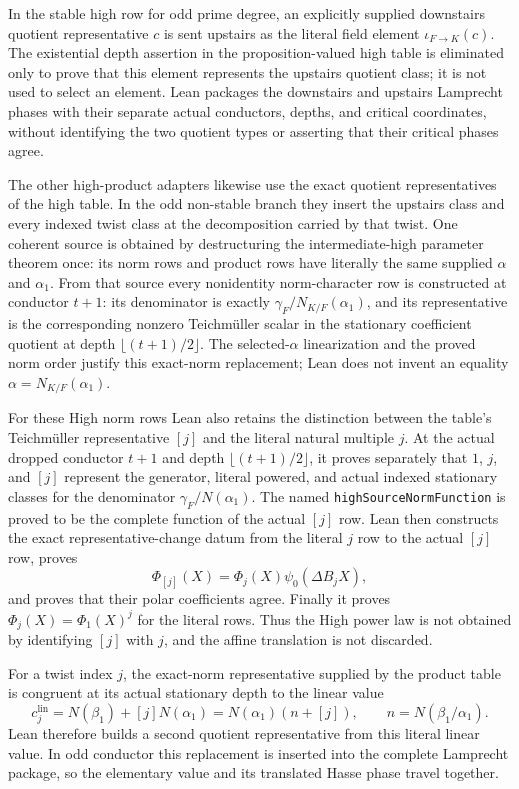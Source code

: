 \begin{definition}
In the stable high row for odd prime degree, an explicitly supplied
downstairs quotient representative $c$ is sent upstairs as the literal field element
$\iota_{F\to K}(c)$.  The existential depth assertion in the proposition-valued
high table is eliminated only to prove that this element represents the
upstairs quotient class; it is not used to select an element.  Lean packages
the downstairs and upstairs Lamprecht phases with their separate actual
conductors, depths, and critical coordinates, without identifying the two
quotient types or asserting that their critical phases agree.

The other high-product adapters likewise use the exact quotient
representatives of the high table.  In the odd non-stable branch they insert
the upstairs class and every indexed twist class at the decomposition carried
by that twist.  One coherent source is obtained by destructuring the
intermediate-high parameter theorem once: its norm rows and product rows have
literally the same supplied $\alpha$ and $\alpha_1$.  From that source every
nonidentity norm-character row is constructed at conductor $t+1$: its
denominator is exactly $\gamma_F/N_{K/F}(\alpha_1)$, and its representative
is the corresponding nonzero Teichm\"uller scalar in the stationary
coefficient quotient at depth $\lfloor(t+1)/2\rfloor$.  The selected-$\alpha$
linearization and the proved norm order justify this exact-norm replacement;
Lean does not invent an equality $\alpha=N_{K/F}(\alpha_1)$.

For these High norm rows Lean also retains the distinction between the
table's Teichm\"uller representative $[j]$ and the literal natural multiple
$j$.  At the actual dropped conductor $t+1$ and depth
$\lfloor(t+1)/2\rfloor$, it proves separately that $1$, $j$, and $[j]$
represent the generator, literal powered, and actual indexed stationary
classes for the denominator $\gamma_F/N(\alpha_1)$.  The named
\texttt{highSourceNormFunction} is proved to be the complete function of
the actual $[j]$ row.  Lean then constructs the exact representative-change
datum from the literal $j$ row to the actual $[j]$ row, proves
\[
 \Phi_{[j]}(X)=\Phi_j(X)\psi_0(\Delta B_jX),
\]
and proves that their polar coefficients agree.  Finally it proves
$\Phi_j(X)=\Phi_1(X)^j$ for the literal rows.  Thus the High power law is
not obtained by identifying $[j]$ with $j$, and the affine translation is
not discarded.

For a twist index $j$, the exact-norm representative supplied by the product
table is congruent at its actual stationary depth to the linear value
\[
  c_j^{\mathrm{lin}}=N(\beta_1)+[j]N(\alpha_1)
    =N(\alpha_1)(n+[j]),
  \qquad n=N(\beta_1/\alpha_1).
\]
Lean therefore builds a second quotient representative from this literal
linear value.  In odd conductor this replacement is inserted into the
complete Lamprecht package, so the elementary value and its translated Hasse
phase travel together.


\end{definition}
